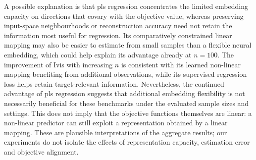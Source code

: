 A possible explanation is that \gls{pls} regression concentrates the limited embedding capacity on directions that covary with the objective value, whereas preserving input-space neighbourhoods or reconstruction accuracy need not retain the information most useful for regression. Its comparatively constrained linear mapping may also be easier to estimate from small samples than a flexible neural embedding, which could help explain its advantage already at $n=100$. The improvement of Ivis with increasing $n$ is consistent with its learned non-linear mapping benefiting from additional observations, while its supervised regression loss helps retain target-relevant information. Nevertheless, the continued advantage of \gls{pls} regression suggests that additional embedding flexibility is not necessarily beneficial for these benchmarks under the evaluated sample sizes and settings. This does not imply that the objective functions themselves are linear: a non-linear predictor can still exploit a representation obtained by a linear mapping. These are plausible interpretations of the aggregate results; our experiments do not isolate the effects of representation capacity, estimation error and objective alignment.



